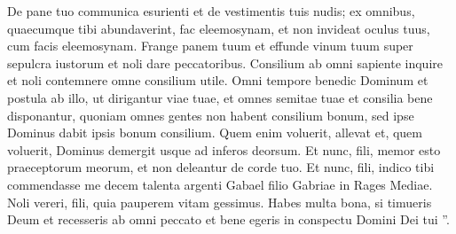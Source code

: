 \begin{biblechapter}
\begin{biblechapter}
\begin{biblechapter}
\begin{biblechapter}
\verse De pane tuo communica esurienti et de vestimentis tuis nudis; ex omnibus, quaecumque tibi abundaverint, fac eleemosynam, et non invideat oculus tuus, cum facis eleemosynam. 
\verse Frange panem tuum et effunde vinum tuum super sepulcra iustorum et noli dare peccatoribus. 
\verse Consilium ab omni sapiente inquire et noli contemnere omne consilium utile. 
\verse Omni tempore benedic Dominum et postula ab illo, ut dirigantur viae tuae, et omnes semitae tuae et consilia bene disponantur, quoniam omnes gentes non habent consilium bonum, sed ipse Dominus dabit ipsis bonum consilium. Quem enim voluerit, allevat et, quem voluerit, Dominus demergit usque ad inferos deorsum. Et nunc, fili, memor esto praeceptorum meorum, et non deleantur de corde tuo. 
\verse Et nunc, fili, indico tibi commendasse me decem talenta argenti Gabael filio Gabriae in Rages Mediae. 
\verse Noli vereri, fili, quia pauperem vitam gessimus. Habes multa bona, si timueris Deum et recesseris ab omni peccato et bene egeris in conspectu Domini Dei tui ”.
 

\end{biblechapter}
\end{biblechapter}
\end{biblechapter}
\end{biblechapter}
